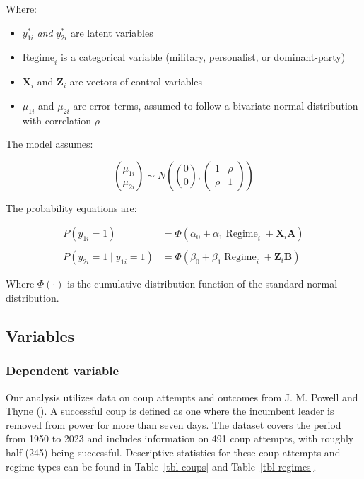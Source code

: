 \documentclass[
  12pt,
]{report}
\begin{document}
Where:

\begin{itemize}
\item
  \(y_{1i}^*\) \emph{and} \(y_{2i}^*\) are latent variables
\item
  \(\text{Regime}_i\) is a categorical variable (military, personalist,
  or dominant-party)
\item
  \(\mathbf{X}_i\) and \(\mathbf{Z}_i\) are vectors of control variables
\item
  \(\mu_{1i}\) and \(\mu_{2i}\) are error terms, assumed to follow a
  bivariate normal distribution with correlation \(\rho\)
\end{itemize}

The model assumes:

\[
\binom{\mu_{1 i}}{\mu_{2 i}} \sim N\left(\binom{0}{0},\left(\begin{array}{ll}
1 & \rho \\
\rho & 1
\end{array}\right)\right)
\]

The probability equations are:

\[
\begin{aligned}
P\left(y_{1 i}=1\right) & =\Phi\left(\alpha_0+\alpha_1 \operatorname{Regime}_i+\mathbf{X}_i \boldsymbol{A}\right) \\
\\
P\left(y_{2 i}=1 \mid y_{1 i}=1\right) & =\Phi\left(\beta_0+\beta_1 \operatorname{Regime}_i+\mathbf{Z}_i \boldsymbol{B}\right)
\end{aligned}
\]

Where \(\Phi(\cdot)\) is the cumulative distribution function of the
standard normal distribution.

\subsection{Variables}\label{variables}

\subsubsection{Dependent variable}\label{dependent-variable}

Our analysis utilizes data on coup attempts and outcomes from J. M.
Powell and Thyne (). A successful coup is
defined as one where the incumbent leader is removed from power for more
than seven days. The dataset covers the period from 1950 to 2023 and
includes information on 491 coup attempts, with roughly half (245) being
successful. Descriptive statistics for these coup attempts and regime
types can be found in Table~\ref{tbl-coups} and Table~\ref{tbl-regimes}.
\end{document}
